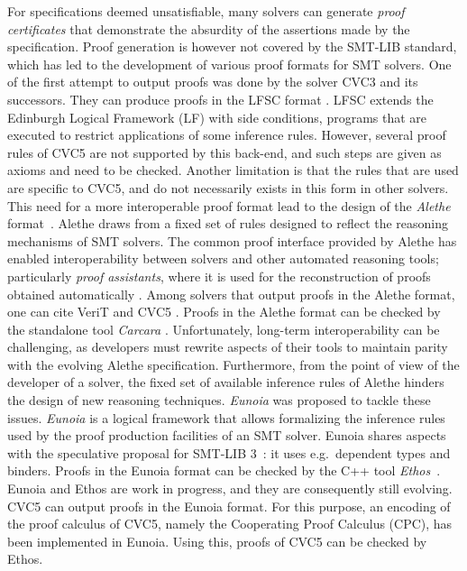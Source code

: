 \documentclass[class=llncs, crop=false]{standalone}
\begin{document}
For specifications deemed unsatisfiable, many solvers
can generate \emph{proof certificates} that demonstrate
the absurdity of the assertions made by the specification.
%
Proof generation is however not covered by the SMT-LIB
standard, which has led to the development of various proof
formats for SMT solvers.
One of the first attempt to output proofs was done by the solver CVC3
and its successors. They can produce proofs in the LFSC format
\cite{DBLP:journals/fmsd/StumpORHT13}. LFSC extends the Edinburgh
Logical Framework (LF) with side conditions, programs that are
executed to restrict applications of some inference rules. However,
several proof rules of CVC5 are not supported by this back-end, and
such steps are given as axioms and need to be checked. Another
limitation is that the rules that are used are specific to CVC5, and
do not necessarily exists in this form in other solvers.
%
This need for a more interoperable proof format lead to the design of the
\emph{Alethe} format~\cite{schurrAletheGenericSMT2021}.  Alethe draws from a fixed set of rules designed
to reflect the reasoning mechanisms of SMT solvers.
%
The common proof interface provided by Alethe has
enabled interoperability between solvers and other
automated reasoning tools;
particularly \emph{proof assistants}, where it is used for the
reconstruction of
proofs obtained automatically
\cite{DBLP:conf/cpp/ArmandFGKTW11,DBLP:conf/cade/SchurrFD21}. Among solvers
that output proofs
in the Alethe format, one can cite VeriT
\cite{DBLP:conf/cade/BoutonODF09} and CVC5 \cite{Barbosa2022}.
%
Proofs in the Alethe format can be checked by the standalone tool
\textit{Carcara} \cite{andreottiCarcaraEfficientProof2023}.
Unfortunately, long-term interoperability can be
challenging, as developers must rewrite aspects
of their tools to maintain parity with the evolving
Alethe specification. Furthermore, from the  point of view of the developer of a
solver, the fixed set of available inference rules of Alethe hinders
the design of new reasoning techniques.
%
\textit{Eunoia} was proposed to tackle these issues. \textit{Eunoia} is a logical framework that allows formalizing
the inference rules used by the proof production facilities
of an SMT solver. Eunoia shares aspects with the speculative proposal
for SMT-LIB 3~\cite{smt3-proposal}: it uses e.g.\ dependent types and binders.
%
Proofs in the
Eunoia format can be checked by the C++ tool
\textit{Ethos}~\cite{EthosUser_manualmdMain}. Eunoia and Ethos are
work in progress, and they are consequently still evolving.
CVC5 can output proofs in the Eunoia format. For this purpose, an
encoding of the proof calculus of CVC5, namely the Cooperating Proof
Calculus (CPC), has been implemented in Eunoia. Using this, proofs of
CVC5 can be checked by Ethos.
\end{document}
